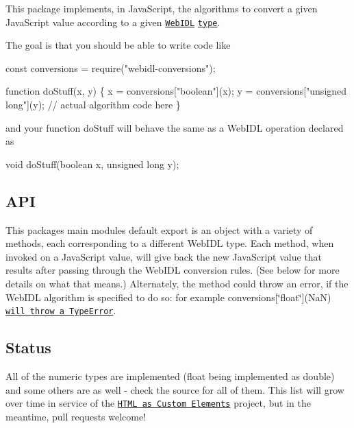 This package implements, in Java\+Script, the algorithms to convert a given Java\+Script value according to a given \href{http://heycam.github.io/webidl/}{\tt Web\+I\+DL} \href{http://heycam.github.io/webidl/#idl-types}{\tt type}.

The goal is that you should be able to write code like


\begin{DoxyCode}
const conversions = require("webidl-conversions");

function doStuff(x, y) \{
    x = conversions["boolean"](x);
    y = conversions["unsigned long"](y);
    // actual algorithm code here
\}
\end{DoxyCode}


and your function {\ttfamily do\+Stuff} will behave the same as a Web\+I\+DL operation declared as


\begin{DoxyCode}
void doStuff(boolean x, unsigned long y);
\end{DoxyCode}


\subsection*{A\+PI}

This package\textquotesingle{}s main module\textquotesingle{}s default export is an object with a variety of methods, each corresponding to a different Web\+I\+DL type. Each method, when invoked on a Java\+Script value, will give back the new Java\+Script value that results after passing through the Web\+I\+DL conversion rules. (See below for more details on what that means.) Alternately, the method could throw an error, if the Web\+I\+DL algorithm is specified to do so\+: for example {\ttfamily conversions\mbox{[}\char`\"{}float\char`\"{}\mbox{]}(NaN)} \href{http://heycam.github.io/webidl/#es-float}{\tt will throw a {\ttfamily Type\+Error}}.

\subsection*{Status}

All of the numeric types are implemented (float being implemented as double) and some others are as well -\/ check the source for all of them. This list will grow over time in service of the \href{https://github.com/dglazkov/html-as-custom-elements}{\tt H\+T\+ML as Custom Elements} project, but in the meantime, pull requests welcome!

